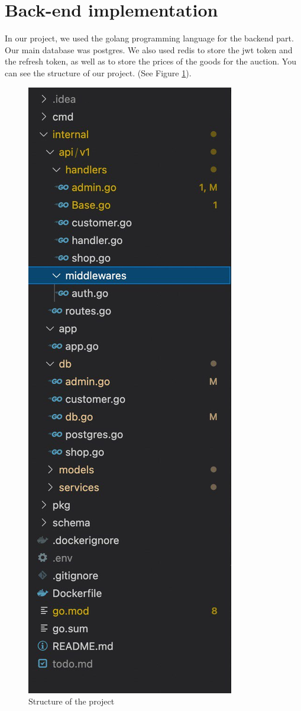 \section{Back-end implementation}
In our project, we used the golang programming language for the backend part. Our main database was postgres. We also used redis to store the jwt token and the refresh token, as well as to store the prices of the goods for the auction. 
You can see the structure of our project. (See Figure \ref{fig:backend1}).
\begin{figure}[ht!]
    \centering
    \includegraphics[scale=0.7]{figures/backend1.jpg}
    \caption{Structure of the project}
    \label{fig:backend1}
\end{figure}

